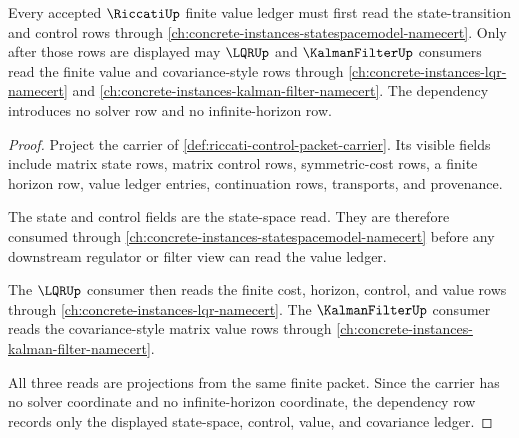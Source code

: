 \begin{theorem}
\label{thm:riccati-state-space-control-dependency}
Every accepted $\RiccatiUp$ finite value ledger must first read the state-transition and control rows through \autoref{ch:concrete-instances-statespacemodel-namecert}. Only after those rows are displayed may $\LQRUp$ and $\KalmanFilterUp$ consumers read the finite value and covariance-style rows through \autoref{ch:concrete-instances-lqr-namecert} and \autoref{ch:concrete-instances-kalman-filter-namecert}. The dependency introduces no solver row and no infinite-horizon row.
\end{theorem}
\begin{proof}
Project the carrier of \autoref{def:riccati-control-packet-carrier}. Its visible fields include matrix state rows, matrix control rows, symmetric-cost rows, a finite horizon row, value ledger entries, continuation rows, transports, and provenance.

The state and control fields are the state-space read. They are therefore consumed through \autoref{ch:concrete-instances-statespacemodel-namecert} before any downstream regulator or filter view can read the value ledger.

The $\LQRUp$ consumer then reads the finite cost, horizon, control, and value rows through \autoref{ch:concrete-instances-lqr-namecert}. The $\KalmanFilterUp$ consumer reads the covariance-style matrix value rows through \autoref{ch:concrete-instances-kalman-filter-namecert}.

All three reads are projections from the same finite packet. Since the carrier has no solver coordinate and no infinite-horizon coordinate, the dependency row records only the displayed state-space, control, value, and covariance ledger.
\end{proof}

